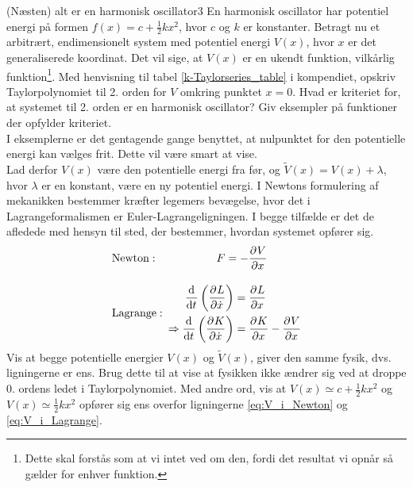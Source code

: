 \begin{opgave}{(Næsten) alt er en harmonisk oscillator}{3} \label{opg:HO}
En harmonisk oscillator har potentiel energi på formen $f(x) = c + \frac{1}{2}kx^2$, hvor $c$ og $k$ er konstanter. Betragt nu et arbitrært, endimensionelt system med potentiel energi $V(x)$, hvor $x$ er det generaliserede koordinat. Det vil sige, at $V(x)$ er en ukendt funktion, vilkårlig funktion\footnote{Dette skal forstås som at vi intet ved om den, fordi det resultat vi opnår så gælder for enhver funktion.}.
\opg Med henvisning til tabel \ref{k-Taylorseries_table} i kompendiet, opskriv Taylorpolynomiet til 2. orden for $V$ omkring punktet $x=0$.
\opg Hvad er kriteriet for, at systemet til 2. orden er en harmonisk oscillator?
\opg Giv eksempler på funktioner der opfylder kriteriet. \\ 
I eksemplerne er det gentagende gange benyttet, at nulpunktet for den potentielle energi kan vælges frit. Dette vil være smart at vise. \\
Lad derfor $V(x)$ være den potentielle energi fra før, og $\tilde{V}(x) = V(x) + \lambda$, hvor $\lambda$ er en konstant, være en ny potentiel energi. I Newtons formulering af mekanikken bestemmer kræfter legemers bevægelse, hvor det i Lagrangeformalismen er Euler-Lagrangeligningen. I begge tilfælde er det de afledede med hensyn til sted, der bestemmer, hvordan systemet opfører sig.
\begin{align}
	&\mathrm{Newton:} \qquad\qquad\quad\enspace F = -\pdif{x}{V} \label{eq:V_i_Newton} \\[1em]
	&\mathrm{Lagrange:} \enspace 
	\begin{aligned}
	\el{\dt{x}} &= \pdif{x}{L} \\
	\Rightarrow \dif{t}{}\left(\pdif{\dt{x}}{K}\right) &= \pdif{x}{K} - \pdif{x}{V}
	\end{aligned} \label{eq:V_i_Lagrange}
\end{align}
\opg Vis at begge potentielle energier $V(x)$ og $\tilde{V}(x)$, giver den samme fysik, dvs. ligningerne er ens.
\opg Brug dette til at vise at fysikken ikke ændrer sig ved at droppe 0. ordens ledet i Taylorpolynomiet. Med andre ord, vis at $V(x) \simeq c + \frac{1}{2}kx^2$ og $V(x) \simeq \frac{1}{2}kx^2$  opfører sig ens overfor ligningerne \eqref{eq:V_i_Newton} og \eqref{eq:V_i_Lagrange}.
\end{opgave}
%
%

